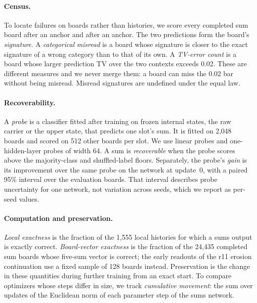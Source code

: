 \paragraph{Census.} To locate failures on boards rather than histories, we
score every completed sum board after an \Lcat{} anchor and after an \Hcat{}
anchor. The two predictions form the board's \emph{signature}. A
\emph{categorical misread} is a board whose signature is closer to the exact
signature of a wrong category than to that of its own. A \emph{TV-error
count} is a board whose larger prediction TV over the two contexts exceeds
0.02. These are different measures and we never merge them: a board can miss
the 0.02 bar without being misread. Misread signatures are undefined under
the equal law.

\paragraph{Recoverability.} A \emph{probe} is a classifier fitted after
training on frozen internal states, the raw carrier or the upper state, that
predicts one slot's sum. It is fitted on 2,048 boards and scored on 512
other boards per slot. We use linear probes and one-hidden-layer probes of
width 64. A sum is \emph{recoverable} when the probe scores above the
majority-class and shuffled-label floors. Separately, the probe's
\emph{gain} is its improvement over the same probe on the network at
update~0, with a paired 95\% interval over the evaluation boards. That
interval describes probe uncertainty for one network, not variation across
seeds, which we report as per-seed values.

\paragraph{Computation and preservation.} \emph{Local exactness} is the
fraction of the 1,555 local histories for which a sums output is exactly
correct. \emph{Board-vector exactness} is the fraction of the 24,435
completed sum boards whose five-sum vector is correct; the early readouts of
the r11 erosion continuation use a fixed sample of 128 boards instead.
Preservation is the change in these quantities during further training from
an exact start. To compare optimizers whose steps differ in size, we track
\emph{cumulative movement}: the sum over updates of the Euclidean norm of
each parameter step of the sums network.

